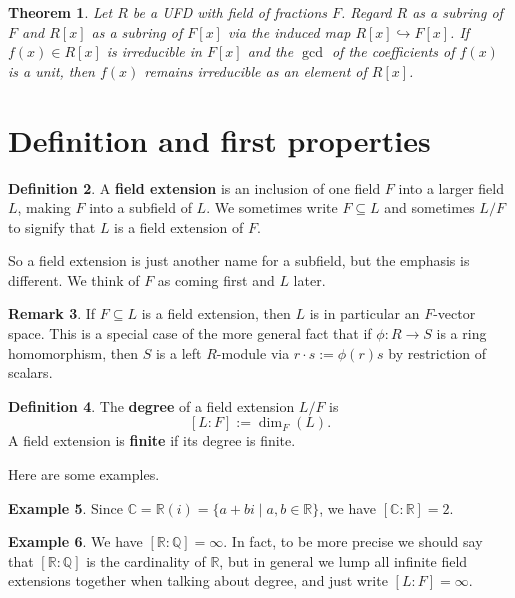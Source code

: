 \documentclass[12pt]{report}
\newtheorem{theorem}{Theorem}[chapter]
\numberwithin{equation}{section}
\numberwithin{theorem}{chapter}
\theoremstyle{definition}
\newtheorem{definition}[theorem]{Definition}
\newtheorem{example}[theorem]{Example}
\newtheorem*{basic properties}{Basic Properties}
\newtheorem*{Important Remark}{Important Remark}
\newtheorem{remark}[theorem]{Remark}
\newcommand{\df}[1]{{\bf #1}\index{#1}}
\newcommand{\C}{\mathbb{C}}
\begin{document}
\begin{theorem}\label{gauss lemma backwards}
	Let $R$ be a UFD  with field of fractions $F$. Regard $R$ as a subring of $F$ and $R[x]$ as a subring of $F[x]$ via the induced map $R[x]\hookrightarrow F[x]$. If $f(x) \in R[x]$ is irreducible in $F[x]$ and the $\gcd$ of the coefficients of $f(x)$ is a unit, then $f(x)$ remains irreducible as an element of $R[x]$.
\end{theorem}





\section{Definition and first properties}


\begin{definition} 
A \df{field extension} is an inclusion of one field $F$ into a larger field $L$, making $F$ into a subfield of $L$. We sometimes write $F \subseteq L$ and sometimes $L/F$ to signify that $L$ is a field extension of $F$.
\end{definition}

So a field extension is just another name for a subfield, but the emphasis is different. We think of $F$ as coming first and $L$ later. 

\begin{remark} 
If $F \subseteq L$ is a field extension, then $L$ is in particular an $F$-vector space. This is a special case of the more general fact that if $\phi\!: R \to S$ is a ring homomorphism, then $S$ is a left $R$-module via $r \cdot s := \phi(r)s$ by restriction of scalars.
\end{remark}


\begin{definition} 
The {\bf degree} of a field extension $L/F$ is
$$[L:F] := \dim_F(L).$$
A field extension is {\bf finite} if its degree is finite.\index{$[L:F]$}
\end{definition}

Here are some examples.

\begin{example} 
Since $\C = \mathbb{R}(i) = \{a+bi\mid a,b\in \mathbb{R}\}$, we have $[\C: \mathbb{R}] = 2$.
\end{example}

\begin{example}
We have $[\mathbb{R}:\mathbb{Q}] = \infty$. In fact, to be more precise we should say that $[\mathbb{R}:\mathbb{Q}]$ is the cardinality of $\mathbb{R}$, but in general we lump all infinite field extensions together when talking about degree, and just write $[L : F] = \infty$.
\end{example}
\end{document}
